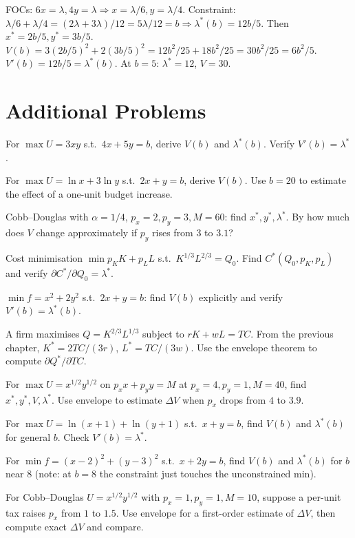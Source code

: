 \begin{solutions}
  \item FOCs: $6 x = \lambda, 4 y = \lambda \Rightarrow x = \lambda/6,
        y = \lambda/4$. Constraint:
        $\lambda/6 + \lambda/4 = (2 \lambda + 3 \lambda)/12
        = 5 \lambda/12 = b \Rightarrow \lambda^*(b) = 12 b/5$. Then
        $x^* = 2 b/5, y^* = 3 b/5$.
        $V(b) = 3(2 b/5)^2 + 2(3 b/5)^2 = 12 b^2/25 + 18 b^2/25
        = 30 b^2/25 = 6 b^2/5$. $V'(b) = 12 b/5 = \lambda^*(b)$.
        \checkmark At $b = 5$: $\lambda^* = 12$, $V = 30$.
\end{solutions}

\section{Additional Problems}

\begin{problems}
  \item For $\max U = 3 x y$ s.t.\ $4 x + 5 y = b$, derive $V(b)$ and
        $\lambda^*(b)$. Verify $V'(b) = \lambda^*$.
  \item For $\max U = \ln x + 3 \ln y$ s.t.\ $2 x + y = b$, derive
        $V(b)$. Use $b = 20$ to estimate the effect of a one-unit budget
        increase.
  \item Cobb--Douglas with $\alpha = 1/4$, $p_x = 2, p_y = 3, M = 60$:
        find $x^*, y^*, \lambda^*$. By how much does $V$ change
        approximately if $p_y$ rises from $3$ to $3.1$?
  \item Cost minimisation $\min p_K K + p_L L$ s.t.\
        $K^{1/3} L^{2/3} = Q_0$. Find $C^*(Q_0, p_K, p_L)$ and verify
        $\partial C^*/\partial Q_0 = \lambda^*$.
  \item $\min f = x^2 + 2 y^2$ s.t.\ $2 x + y = b$: find $V(b)$
        explicitly and verify $V'(b) = \lambda^*(b)$.
  \item A firm maximises $Q = K^{2/3} L^{1/3}$ subject to
        $r K + w L = TC$. From the previous chapter, $K^* = 2 TC/(3 r)$,
        $L^* = TC/(3 w)$. Use the envelope theorem to compute
        $\partial Q^*/\partial TC$.
  \item For $\max U = x^{1/2} y^{1/2}$ on $p_x x + p_y y = M$ at
        $p_x = 4, p_y = 1, M = 40$, find $x^*, y^*, V, \lambda^*$. Use
        envelope to estimate $\Delta V$ when $p_x$ drops from $4$ to
        $3.9$.
  \item For $\max U = \ln(x + 1) + \ln(y + 1)$ s.t.\ $x + y = b$, find
        $V(b)$ and $\lambda^*(b)$ for general $b$. Check
        $V'(b) = \lambda^*$.
  \item For $\min f = (x - 2)^2 + (y - 3)^2$ s.t.\ $x + 2 y = b$, find
        $V(b)$ and $\lambda^*(b)$ for $b$ near $8$ (note: at $b = 8$ the
        constraint just touches the unconstrained min).
  \item For Cobb--Douglas $U = x^{1/2} y^{1/2}$ with
        $p_x = 1, p_y = 1, M = 10$, suppose a per-unit tax raises $p_x$
        from $1$ to $1.5$. Use envelope for a first-order estimate of
        $\Delta V$, then compute exact $\Delta V$ and compare.


\end{problems}

